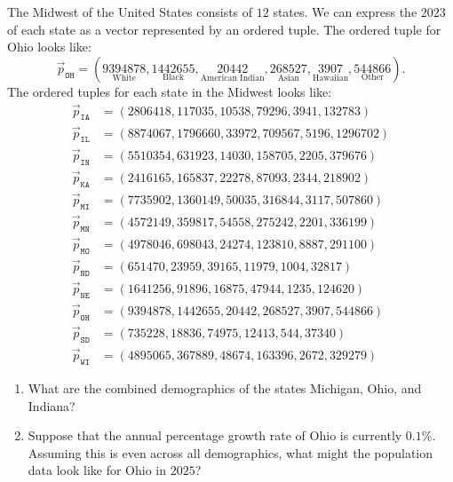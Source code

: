 \documentclass{ximera}
\begin{document}
\begin{example} %
  The Midwest of the United States consists of $12$ states. We can
  express the $2023$
  of each state as a vector represented by an ordered tuple. The
  ordered tuple for Ohio looks like:
  \[
  \vec{p}_{\texttt{OH}} = (\underset{\text{White}}{9394878},\underset{\text{Black}}{1442655},\underset{\text{American Indian}}{20442},\underset{\text{Asian}}{268527},\underset{\text{Hawaiian}}{3907},\underset{\text{Other}}{544866}).
  \]
  The ordered tuples for each state in the Midwest looks like:
\begin{align*}
  \vec{p}_{\texttt{IA}} &= (2806418,117035,10538,79296,3941,132783)\\
  \vec{p}_{\texttt{IL}} &= (8874067,1796660,33972,709567,5196,1296702)\\
  \vec{p}_{\texttt{IN}} &= (5510354,631923,14030,158705,2205,379676)\\
  \vec{p}_{\texttt{KA}} &= (2416165,165837,22278,87093,2344,218902)\\
  \vec{p}_{\texttt{MI}} &= (7735902,1360149,50035,316844,3117,507860)\\
  \vec{p}_{\texttt{MN}} &= (4572149,359817,54558,275242,2201,336199)\\
  \vec{p}_{\texttt{MO}} &= (4978046,698043,24274,123810,8887,291100)\\
  \vec{p}_{\texttt{ND}} &= (651470,23959,39165,11979,1004,32817)\\
  \vec{p}_{\texttt{NE}} &= (1641256,91896,16875,47944,1235,124620)\\
  \vec{p}_{\texttt{OH}} &= (9394878,1442655,20442,268527,3907,544866)\\
  \vec{p}_{\texttt{SD}} &= (735228,18836,74975,12413,544,37340)\\
  \vec{p}_{\texttt{WI}} &= (4895065,367889,48674,163396,2672,329279)
\end{align*}
\begin{enumerate}
\item What are the combined demographics of the states Michigan, Ohio,
  and Indiana?
\item Suppose that the annual percentage growth rate of Ohio is
  currently $0.1\%$. Assuming this is even across all demographics,
  what might the population data look like for Ohio in $2025$?
\end{enumerate}
\begin{solution}

\end{solution}
\end{example}
\end{document}
